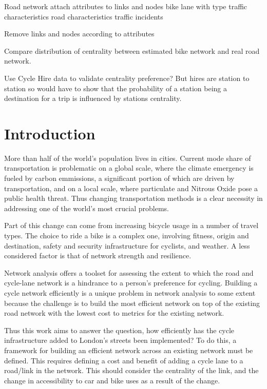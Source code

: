 \documentclass[11pt]{article} %
\begin{document}
Road network
	attach attributes to links and nodes
		bike lane with type
		traffic characteristics
		road characteristics
		traffic incidents
		
Remove links and nodes according to attributes

Compare distribution of centrality between estimated bike network and real road network. 

Use Cycle Hire data to validate centrality preference?
	But hires are station to station so would have to show that the probability of a station being a destination for a trip is influenced by stations centrality. 


	
	









\section{Introduction}

	More than half of the world's population lives in cities. Current mode share of transportation is problematic on a global scale, where the climate emergency is fueled by carbon emmissions, a significant portion of which are driven by transportation, and on a local scale, where particulate and Nitrous Oxide pose a public health threat. Thus changing transportation methods is a clear necessity in addressing one of the world's most crucial problems. 
	
	Part of this change can come from increasing bicycle usage in a number of travel types. The choice to ride a bike is a complex one, involving fitness, origin and destination, safety and security infrastructure for cyclists, and weather. A less considered factor is that of network strength and resilience.
	
	Network analysis offers a toolset for assessing the extent to which the road and cycle-lane network is a hindrance to a person's preference for cycling. Building a cycle network efficiently is a unique problem in network analysis to some extent because the challenge is to build the most efficient network on top of the existing road network with the lowest cost to metrics for the existing network. 
	
	Thus this work aims to answer the question, how efficiently has the cycle infrastructure added to London's streets been implemented? To do this, a framework for building an efficient network across an existing network must be defined. This requires defining a cost and benefit of adding a cycle lane to a road/link in the network. This should consider the centrality of the link, and the change in accessibility to car and bike uses as a result of the change.
	
\end{document}
